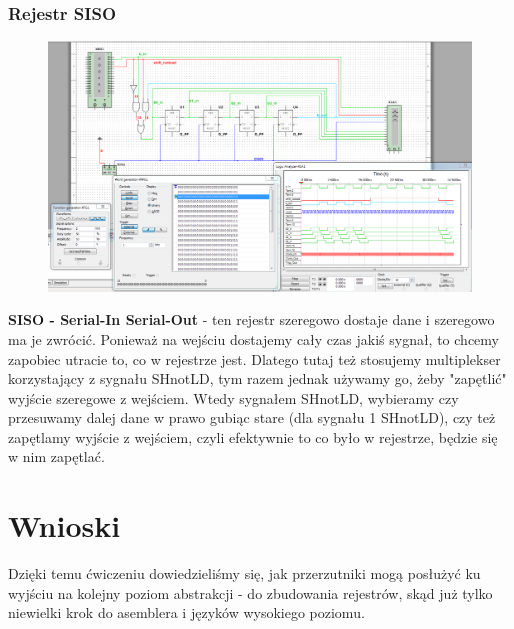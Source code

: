 \documentclass[12pt,a4paper]{article}
\begin{document}
\subsubsection{Rejestr SISO}
\begin{figure}[H]
\centering
\includegraphics[width=\textwidth]{img/3hSISO}
\end{figure}

\textbf{SISO - Serial-In Serial-Out} - ten rejestr szeregowo dostaje dane i szeregowo ma je zwrócić. Ponieważ na wejściu dostajemy cały czas jakiś sygnał, to chcemy zapobiec utracie to, co w rejestrze jest. Dlatego tutaj też stosujemy multiplekser korzystający z sygnału SHnotLD, tym razem jednak używamy go, żeby "zapętlić" wyjście szeregowe z wejściem. Wtedy sygnałem SHnotLD, wybieramy czy przesuwamy dalej dane w prawo gubiąc stare (dla sygnału 1 SHnotLD), czy też zapętlamy wyjście z wejściem, czyli efektywnie to co było w rejestrze, będzie się w nim zapętlać.



\section{Wnioski}
Dzięki temu ćwiczeniu dowiedzieliśmy się, jak przerzutniki mogą posłużyć ku wyjściu na kolejny poziom abstrakcji - do zbudowania rejestrów, skąd już tylko niewielki krok do asemblera i języków wysokiego poziomu.
\end{document}

